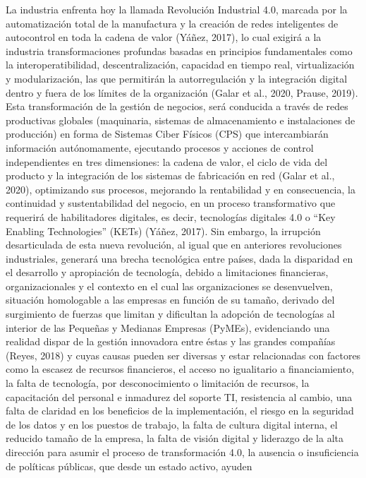 \documentclass{article}
\begin{document}
La industria enfrenta hoy la llamada Revolución Industrial 4.0, marcada
por la automatización total de la manufactura y la creación de redes
inteligentes de autocontrol en toda la cadena de valor (Yáñez, 2017), lo
cual exigirá a la industria transformaciones profundas basadas en
principios fundamentales como la interoperatibilidad, descentralización,
capacidad en tiempo real, virtualización y modularización, las que
permitirán la autorregulación y la integración digital dentro y fuera de
los límites de la organización (Galar et al., 2020, Prause, 2019). Esta
transformación de la gestión de negocios, será conducida a través de
redes productivas globales (maquinaria, sistemas de almacenamiento e
instalaciones de producción) en forma de Sistemas Ciber Físicos (CPS)
que intercambiarán información autónomamente, ejecutando procesos y
acciones de control independientes en tres dimensiones: la cadena de
valor, el ciclo de vida del producto y la integración de los sistemas de
fabricación en red (Galar et al., 2020), optimizando sus procesos,
mejorando la rentabilidad y en consecuencia, la continuidad y
sustentabilidad del negocio, en un proceso transformativo que requerirá
de habilitadores digitales, es decir, tecnologías digitales 4.0 o ``Key
Enabling Technologies'' (KETs) (Yáñez, 2017). Sin embargo, la irrupción
desarticulada de esta nueva revolución, al igual que en anteriores
revoluciones industriales, generará una brecha tecnológica entre países,
dada la disparidad en el desarrollo y apropiación de tecnología, debido
a limitaciones financieras, organizacionales y el contexto en el cual
las organizaciones se desenvuelven, situación homologable a las empresas
en función de su tamaño, derivado del surgimiento de fuerzas que limitan
y dificultan la adopción de tecnologías al interior de las Pequeñas y
Medianas Empresas (PyMEs), evidenciando una realidad dispar de la
gestión innovadora entre éstas y las grandes compañías (Reyes, 2018) y
cuyas causas pueden ser diversas y estar relacionadas con factores como
la escasez de recursos financieros, el acceso no igualitario a
financiamiento, la falta de tecnología, por desconocimiento o limitación
de recursos, la capacitación del personal e inmadurez del soporte TI,
resistencia al cambio, una falta de claridad en los beneficios de la
implementación, el riesgo en la seguridad de los datos y en los puestos
de trabajo, la falta de cultura digital interna, el reducido tamaño de
la empresa, la falta de visión digital y liderazgo de la alta dirección
para asumir el proceso de transformación 4.0, la ausencia o
insuficiencia de políticas públicas, que desde un estado activo, ayuden
\end{document}
